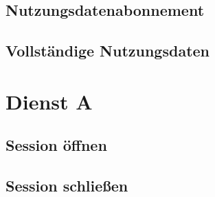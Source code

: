 \subsection*{Nutzungsdatenabonnement}
\label{subsec:Nachrichten:Dienst7:ConsumptionSubscription}





% 

% 



\subsection*{Vollständige Nutzungsdaten}
\label{subsec:Nachrichten:Dienst5:CompleteConsumption}





\section{Dienst A}
\label{sec:Nachrichten:DienstA}

\subsection*{Session öffnen}
\label{subsec:Nachrichten:DienstA:OpenSession}





\subsection*{Session schließen}
\label{subsec:Nachrichten:DienstA:CloseSession}





